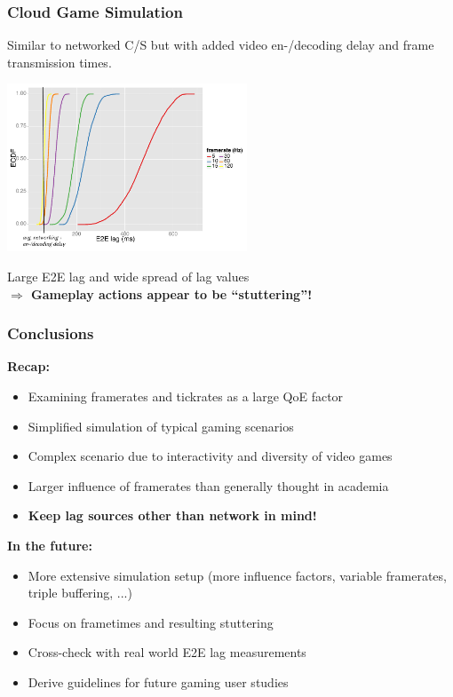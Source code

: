 \documentclass{UDEbeamerEN}
\begin{document}
\begin{frame}
	\frametitle{Cloud Game Simulation}

	\begin{center}
		Similar to networked C/S but with added video en-/decoding delay and frame transmission times.

		\includegraphics[height=5cm]{extras/cloudgaming-lag-cdf.pdf}

		Large E2E lag and wide spread of lag values\\
		\textbf{$\Rightarrow$ Gameplay actions appear to be ``stuttering''!}
	\end{center}
\end{frame}




\begin{frame}
	\frametitle{Conclusions}

	\textbf{Recap:}
	\begin{itemize}
		\item Examining framerates and tickrates as a large QoE factor
		\item Simplified simulation of typical gaming scenarios
		\item Complex scenario due to interactivity and diversity of video games
		\item Larger influence of framerates than generally thought in academia
		\item \textbf{Keep lag sources other than network in mind!}
	\end{itemize}


	\pause
	\textbf{In the future:}
	\begin{itemize}
		\item More extensive simulation setup (more influence factors, variable framerates, triple buffering, ...)
		\item Focus on frametimes and resulting stuttering
		\item Cross-check with real world E2E lag measurements
		\item Derive guidelines for future gaming user studies
	\end{itemize}
\end{frame}
\end{document}

